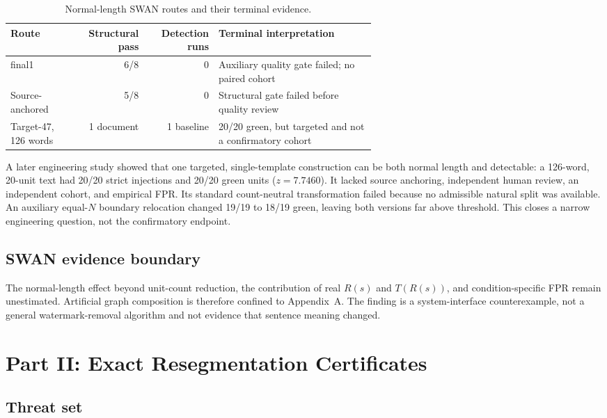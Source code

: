 \documentclass[10pt]{article}
\begin{document}
\begin{table}[t]
\caption{Normal-length SWAN routes and their terminal evidence.}
\label{tab:swan-stops}
\centering
\small
\begin{tabular}{p{0.18\linewidth}rrp{0.43\linewidth}}
\toprule
Route & Structural pass & Detection runs & Terminal interpretation \\
\midrule
final1 & 6/8 & 0 & Auxiliary quality gate failed; no paired cohort \\
Source-anchored & 5/8 & 0 & Structural gate failed before quality review \\
Target-47, 126 words & 1 document & 1 baseline &
20/20 green, but targeted and not a confirmatory cohort \\
\bottomrule
\end{tabular}
\end{table}

A later engineering study showed that one targeted, single-template
construction can be both normal length and detectable: a 126-word,
20-unit text had 20/20 strict injections and 20/20 green units
($z=7.7460$). It lacked source anchoring, independent human review, an
independent cohort, and empirical FPR. Its standard count-neutral
transformation failed because no admissible natural split was available.
An auxiliary equal-$N$ boundary relocation changed 19/19 to 18/19 green,
leaving both versions far above threshold. This closes a narrow engineering
question, not the confirmatory endpoint.

\subsection{SWAN evidence boundary}

The normal-length effect beyond unit-count reduction, the contribution of
real $R(s)$ and $T(R(s))$, and condition-specific FPR remain unestimated.
Artificial graph composition is therefore confined to Appendix~A. The
finding is a system-interface counterexample, not a general watermark-removal
algorithm and not evidence that sentence meaning changed.

\section{Part II: Exact Resegmentation Certificates}

\subsection{Threat set}
\end{document}
